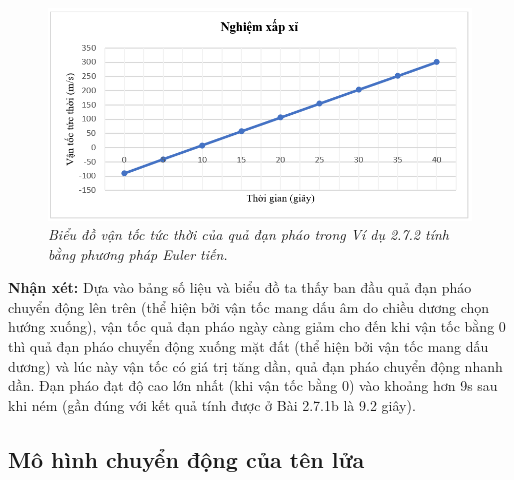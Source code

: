 \begin{figure}[H]
	\centering
	\includegraphics[scale=0.8]{Images/hinh_2_23.png}
	\caption[Biểu đồ vận tốc tức thời của quả đạn pháo trong Ví dụ 2.7.2 tính bằng phương pháp Euler tiến.
	]{\itshape\fontsize{13pt}{0pt}\selectfont\centering Biểu đồ vận tốc tức thời của quả đạn pháo trong Ví dụ 2.7.2 tính bằng phương pháp Euler tiến.}
	\label{hinh2.23}
\end{figure} 
\noindent\textbf{Nhận xét:} Dựa vào bảng số liệu và biểu đồ ta thấy ban đầu quả đạn pháo chuyển động lên trên (thể hiện bởi vận tốc mang dấu âm do chiều dương chọn hướng xuống),  vận tốc quả đạn pháo ngày càng giảm cho đến khi vận tốc bằng 0 thì quả đạn pháo chuyển động xuống mặt đất (thể hiện bởi vận tốc mang dấu dương) và lúc này vận tốc có giá trị tăng dần, quả đạn pháo chuyển động nhanh dần. Đạn pháo đạt độ cao lớn nhất (khi vận tốc bằng 0) vào khoảng hơn 9s sau khi ném (gần đúng với kết quả tính được ở Bài 2.7.1b là 9.2 giây).
\subsection{Mô hình chuyển động của tên lửa}
